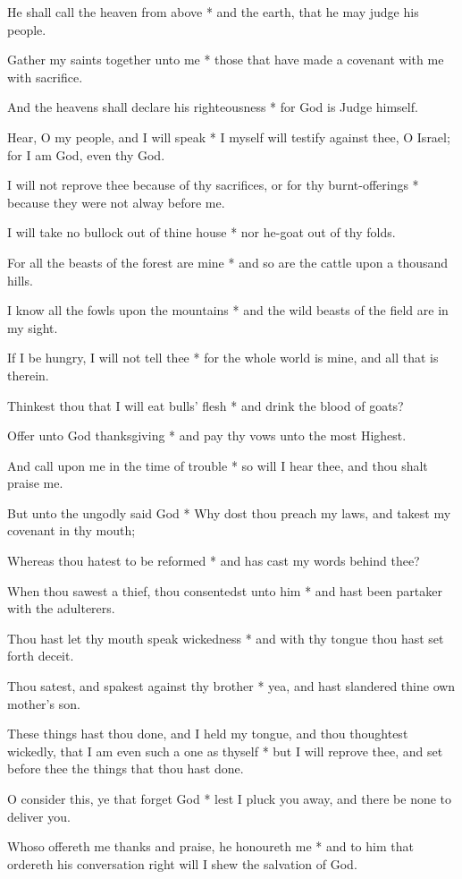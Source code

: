 He shall call the heaven from above * and the earth, that he may judge his people.

Gather my saints together unto me * those that have made a covenant with me with sacrifice.

And the heavens shall declare his righteousness * for God is Judge himself.

Hear, O my people, and I will speak * I myself will testify against thee, O Israel; for I am God, even thy God.

I will not reprove thee because of thy sacrifices, or for thy burnt-offerings * because they were not alway before me.

I will take no bullock out of thine house * nor he-goat out of thy folds.

For all the beasts of the forest are mine * and so are the cattle upon a thousand hills.

I know all the fowls upon the mountains * and the wild beasts of the field are in my sight.

If I be hungry, I will not tell thee * for the whole world is mine, and all that is therein.

Thinkest thou that I will eat bulls' flesh * and drink the blood of goats?

Offer unto God thanksgiving * and pay thy vows unto the most Highest.

And call upon me in the time of trouble * so will I hear thee, and thou shalt praise me.

But unto the ungodly said God * Why dost thou preach my laws, and takest my covenant in thy mouth;

Whereas thou hatest to be reformed * and has cast my words behind thee?

When thou sawest a thief, thou consentedst unto him * and hast been partaker with the adulterers.

Thou hast let thy mouth speak wickedness * and with thy tongue thou hast set forth deceit.

Thou satest, and spakest against thy brother * yea, and hast slandered thine own mother's son.

These things hast thou done, and I held my tongue, and thou thoughtest wickedly, that I am even such a one as thyself * but I will reprove thee, and set before thee the things that thou hast done.

O consider this, ye that forget God * lest I pluck you away, and there be none to deliver you.

Whoso offereth me thanks and praise, he honoureth me * and to him that ordereth his conversation right will I shew the salvation of God.

